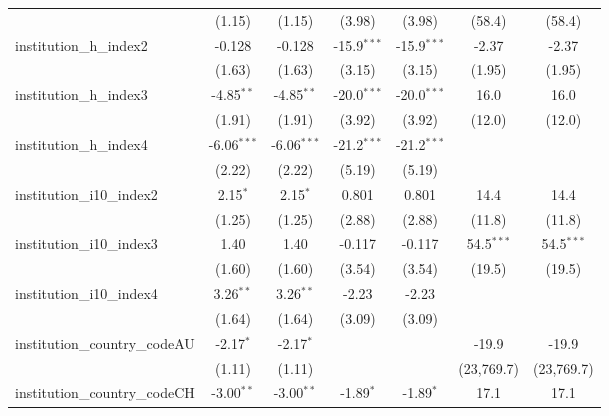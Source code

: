 \begin{tabular}{lcccccc}
                                         & (1.15)        & (1.15)        & (3.98)        & (3.98)        & (58.4)       & (58.4)\\   
   institution\_h\_index2                & -0.128        & -0.128        & -15.9$^{***}$ & -15.9$^{***}$ & -2.37        & -2.37\\   
                                         & (1.63)        & (1.63)        & (3.15)        & (3.15)        & (1.95)       & (1.95)\\   
   institution\_h\_index3                & -4.85$^{**}$  & -4.85$^{**}$  & -20.0$^{***}$ & -20.0$^{***}$ & 16.0         & 16.0\\   
                                         & (1.91)        & (1.91)        & (3.92)        & (3.92)        & (12.0)       & (12.0)\\   
   institution\_h\_index4                & -6.06$^{***}$ & -6.06$^{***}$ & -21.2$^{***}$ & -21.2$^{***}$ &              &   \\   
                                         & (2.22)        & (2.22)        & (5.19)        & (5.19)        &              &   \\   
   institution\_i10\_index2              & 2.15$^{*}$    & 2.15$^{*}$    & 0.801         & 0.801         & 14.4         & 14.4\\   
                                         & (1.25)        & (1.25)        & (2.88)        & (2.88)        & (11.8)       & (11.8)\\   
   institution\_i10\_index3              & 1.40          & 1.40          & -0.117        & -0.117        & 54.5$^{***}$ & 54.5$^{***}$\\   
                                         & (1.60)        & (1.60)        & (3.54)        & (3.54)        & (19.5)       & (19.5)\\   
   institution\_i10\_index4              & 3.26$^{**}$   & 3.26$^{**}$   & -2.23         & -2.23         &              &   \\   
                                         & (1.64)        & (1.64)        & (3.09)        & (3.09)        &              &   \\   
   institution\_country\_codeAU          & -2.17$^{*}$   & -2.17$^{*}$   &               &               & -19.9        & -19.9\\   
                                         & (1.11)        & (1.11)        &               &               & (23,769.7)   & (23,769.7)\\   
   institution\_country\_codeCH          & -3.00$^{**}$  & -3.00$^{**}$  & -1.89$^{*}$   & -1.89$^{*}$   & 17.1         & 17.1\\   

\end{tabular}
